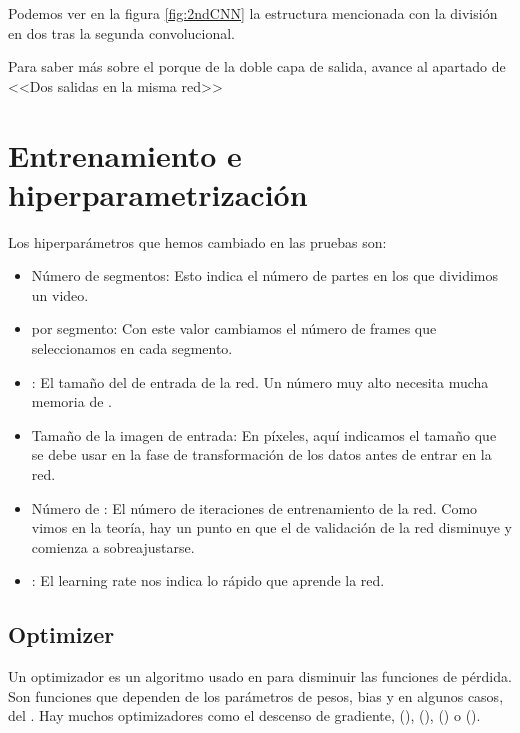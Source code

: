 Podemos ver en la figura \ref{fig:2ndCNN} la estructura mencionada con la división en dos tras la segunda convolucional.


Para saber más sobre el porque de la doble capa de salida, avance al apartado de <<Dos salidas en la misma red>>


\section{Entrenamiento e hiperparametrización}

Los hiperparámetros que hemos cambiado en las pruebas son:

\begin{itemize}
  \item Número de segmentos: Esto indica el número de partes en los que dividimos un video.

  \item {} por segmento: Con este valor cambiamos el número de frames que seleccionamos en cada segmento.

  \item {}: El tamaño del  de entrada de la red. Un número muy alto necesita mucha memoria de .

  \item Tamaño de la imagen de entrada: En píxeles, aquí indicamos el tamaño que se debe usar en la fase de transformación de los datos antes de entrar en la red.

  \item Número de : El número de iteraciones de entrenamiento de la red. Como vimos en la teoría, hay un punto en que el  de validación de la red disminuye y comienza a sobreajustarse.

  \item {}: El learning rate nos indica lo rápido que aprende la red.
\end{itemize}

\subsection{Optimizer}

Un optimizador es un algoritmo usado en  para disminuir las funciones de pérdida. Son funciones que dependen de los parámetros de pesos, bias y en algunos casos, del . Hay muchos optimizadores como el descenso de gradiente,  (),  (),  () o  ().

